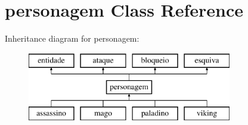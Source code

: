 \hypertarget{classpersonagem}{}\section{personagem Class Reference}
\label{classpersonagem}
Inheritance diagram for personagem\+:\begin{figure}[H]
\begin{center}
\leavevmode
\includegraphics[height=3.000000cm]{classpersonagem}
\end{center}
\end{figure}
